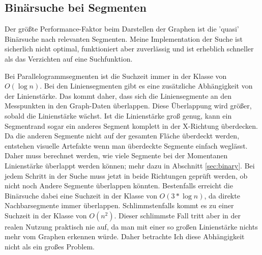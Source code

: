 \subsection{Binärsuche bei Segmenten}
Der größte Performance-Faktor beim Darstellen der Graphen ist die 'quasi' Binärsuche nach relevanten Segmenten.
Meine Implementation der Suche ist sicherlich nicht optimal, funktioniert aber zuverlässig und ist erheblich schneller als das Verzichten auf eine Suchfunktion.
\par
Bei Parallelogrammsegmenten ist die Suchzeit immer in der Klasse von $O(\log{}n)$.
Bei den Liniensegmenten gibt es eine zusätzliche Abhängigkeit von der Linienstärke.
Das kommt daher, dass sich die Liniensegmente an den Messpunkten in den Graph-Daten überlappen.
Diese Überlappung wird größer, sobald die Linienstärke wächst.
Ist die Linienstärke groß genug, kann ein Segmentrand sogar ein anderes Segment komplett in der X-Richtung überdecken.
Da die anderen Segmente nicht auf der gesamten Fläche überdeckt werden, entstehen visuelle Artefakte wenn man überdeckte Segmente einfach weglässt.
Daher muss berechnet werden, wie viele Segmente bei der Momentanen Linienstärke überlappt werden können; mehr dazu in Abschnitt \ref{sec:binary}.
Bei jedem Schritt in der Suche muss jetzt in beide Richtungen geprüft werden, ob nicht noch Andere Segmente überlappen könnten.
Bestenfalls erreicht die Binärsuche dabei eine Suchzeit in der Klasse von $O(3*\log{}n)$, da direkte Nachbarsegmente immer überlappen.
Schlimmstenfalls kommt es zu einer Suchzeit in der Klasse von $O(n^2)$.
Dieser schlimmste Fall tritt aber in der realen Nutzung praktisch nie auf, da man mit einer so großen Linienstärke nichts mehr vom Graphen erkennen würde.
Daher betrachte Ich diese Abhängigkeit nicht als ein großes Problem. 

